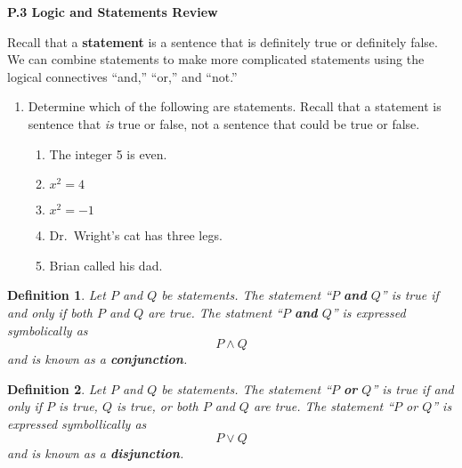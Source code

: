 \documentclass[12 pt]{article}
\theoremstyle{definition}
\theoremstyle{plain}
\theoremstyle{mytheorem}
\theoremstyle{myexample}
\theoremstyle{mydefinition}
\newtheorem{definition}{Definition}
\begin{document}
\begin{center}
\textbf{P.3 Logic and Statements Review}
\end{center}

Recall that a \textbf{statement} is a sentence that is definitely true or definitely false.  We can combine statements to make more complicated statements using the logical connectives ``and,'' ``or,'' and ``not.''\\

\begin{center}
\end{center}

\begin{enumerate}  
\item Determine which of the following are statements.  Recall that a statement is sentence that \textit{is} true or false, not a sentence that could be true or false.
	\begin{enumerate} \itemsep=.5in
	\item The integer 5 is even.
	\item $x^2=4$
	\item $x^2=-1$
	\item Dr.~Wright's cat has three legs.
	\item Brian called his dad. 
	\vspace{.5in}
	\end{enumerate}
\end{enumerate}

\begin{definition}  Let $P$ and $Q$ be statements.  The statement ``$P$ \textbf{and} $Q$'' is true if and only if both $P$ and $Q$ are true.  The statment ``$P$ \textbf{and} $Q$'' is expressed symbolically as
\[ P \wedge  Q \]
and is known as a \textbf{conjunction}.
\end{definition}

\begin{definition}  Let $P$ and $Q$ be statements.  The statement ``$P$ \textbf{or} $Q$'' is true if and only if $P$ is true, $Q$ is true, or both $P$ and $Q$ are true.  The statement ``$P$ or $Q$'' is expressed symbollically as 
\[ P \vee Q \] 
and is known as a \textbf{disjunction}.
\end{definition}
\end{document}
